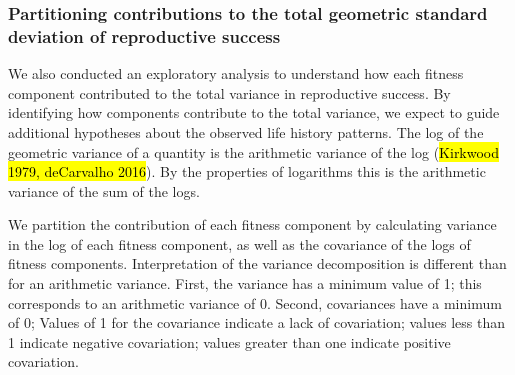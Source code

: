 \documentclass[12pt, oneside, titlepage]{article}   	%
\begin{document}
\subsubsection{Partitioning contributions to the total geometric standard deviation of reproductive success}

We also conducted an exploratory analysis to understand how each fitness component contributed to the total variance in reproductive success. By identifying how components contribute to the total variance, we expect to guide additional hypotheses about the observed life history patterns. The log of the geometric variance of a quantity is the arithmetic variance of the log (\hl{Kirkwood 1979, deCarvalho 2016}). By the properties of logarithms this is the arithmetic variance of the sum of the logs. 

We partition the contribution of each fitness component by calculating variance in the log of each fitness component, as well as the covariance of the logs of fitness components. Interpretation of the variance decomposition is different than for an arithmetic variance. First, the variance has a minimum value of 1; this corresponds to an arithmetic variance of 0. Second, covariances have a minimum of 0; Values of 1 for the covariance indicate a lack of covariation; values less than 1 indicate negative covariation; values greater than one indicate positive covariation. 

\iffalse
\end{document}
